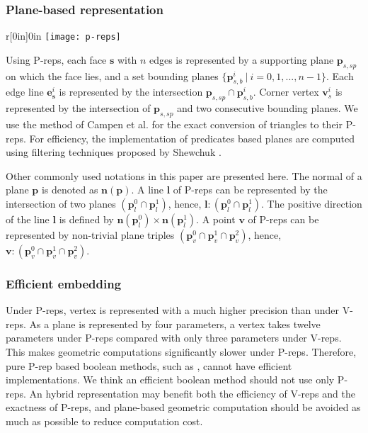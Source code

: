 \label{sec:substrates}
\subsubsection{Plane-based representation}


\begin{wrapfigure}{r}[0in]{0in}
\texttt{[image: p-reps]}
\end{wrapfigure}

Using P-reps, each face $\bm{s}$ with $n$ edges is represented by a supporting plane $\bm{p}_{s,sp}$ on which the face lies, and a set bounding planes $\{\bm{p}_{s,b}^i \ \vert\  i = 0, 1,...,n-1\}$. Each edge line $\bm{e}_{\bm{s}}^i$ is represented by the intersection $\bm{p}_{s,sp} \cap \bm{p}_{s,b}^i$.
Corner vertex $\bm{v}_s^i$ is represented by
the intersection of $\bm{p}_{s,sp}$ and two consecutive bounding planes. We use the method of Campen et al. \cite{campen2010exact} for the exact conversion of triangles to their P-reps. For efficiency, the implementation of predicates based planes are computed using filtering techniques proposed by Shewchuk \cite{shewchuk1997adaptive}.


Other commonly used notations in this paper are presented here. The normal of a plane $\bm{p}$ is denoted as $\bm{n}(\bm{p})$. A line $\bm{l}$ of P-reps can be represented by the intersection of two planes $(\bm{p}_l^0 \cap \bm{p}_l^1)$, hence, $\bm{l}\colon(\bm{p}_l^0 \cap \bm{p}_l^1)$. The positive direction of the line $\bm{l}$ is defined by $\bm{n}(\bm{p}_l^0) \times \bm{n}(\bm{p}_l^1)$.
A point $\bm{v}$ of P-reps can be represented by non-trivial plane triples $(\bm{p}_v^0 \cap \bm{p}_v^1 \cap \bm{p}_v^2)$, hence, $\bm{v}\colon(\bm{p}_v^0 \cap \bm{p}_v^1 \cap \bm{p}_v^2)$.

\subsubsection{Efficient embedding}

Under P-reps, vertex is represented with a much higher precision than under V-reps. As a plane is represented by four parameters, a vertex takes twelve parameters under P-reps compared with only three parameters under V-reps. This makes geometric computations significantly slower under P-reps. Therefore, pure P-rep based boolean methods, such as \cite{sugihara1990solid,banerjee1996topologically}, cannot have efficient implementations. We think an efficient boolean method should not use only P-reps. An hybrid representation may benefit both the efficiency of V-reps and the exactness of P-reps, and plane-based geometric computation should be avoided as much as possible to reduce computation cost.

